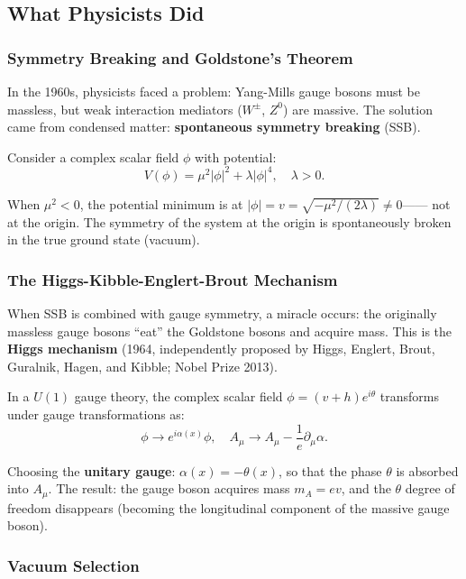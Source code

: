 \documentclass[12pt,a4paper]{article}
\theoremstyle{remark}
\begin{document}
\subsection{What Physicists Did}

\subsubsection{Symmetry Breaking and Goldstone's Theorem}

In the 1960s, physicists faced a problem: Yang-Mills gauge bosons must be
massless, but weak interaction mediators ($W^\pm$, $Z^0$) are massive. The solution
came from condensed matter: \textbf{spontaneous symmetry breaking} (SSB).

Consider a complex scalar field $\phi$ with potential:
\begin{equation}
    V(\phi) = \mu^2 |\phi|^2 + \lambda |\phi|^4, \quad \lambda > 0.
\end{equation}

When $\mu^2 < 0$, the potential minimum is at $|\phi| = v = \sqrt{-\mu^2/(2\lambda)} \neq 0$——
not at the origin. The symmetry of the system at the origin is spontaneously broken in the true ground state (vacuum).

\subsubsection{The Higgs-Kibble-Englert-Brout Mechanism}

When SSB is combined with gauge symmetry, a miracle occurs: the originally massless gauge bosons ``eat'' the Goldstone bosons
and acquire mass. This is the \textbf{Higgs mechanism} (1964, independently proposed by Higgs, Englert, Brout, Guralnik,
Hagen, and Kibble; Nobel Prize 2013).

In a $U(1)$ gauge theory, the complex scalar field $\phi = (v + h)e^{i\theta}$ transforms under gauge transformations as:
\begin{equation}
    \phi \to e^{i\alpha(x)}\phi, \quad A_\mu \to A_\mu - \frac{1}{e}\partial_\mu\alpha.
\end{equation}

Choosing the \textbf{unitary gauge}: $\alpha(x) = -\theta(x)$, so that the phase $\theta$ is absorbed into $A_\mu$.
The result: the gauge boson acquires mass $m_A = ev$, and the $\theta$ degree of freedom disappears (becoming the longitudinal component
of the massive gauge boson).

\subsubsection{Vacuum Selection}
\end{document}
